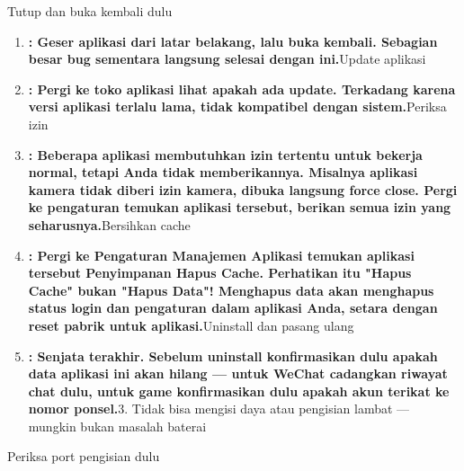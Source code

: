 
Tutup dan buka kembali dulu

\begin{enumerate}
  \item \textbf{: Geser aplikasi dari latar belakang, lalu buka kembali. Sebagian besar bug sementara langsung selesai dengan ini.}Update aplikasi
  \item \textbf{: Pergi ke toko aplikasi lihat apakah ada update. Terkadang karena versi aplikasi terlalu lama, tidak kompatibel dengan sistem.}Periksa izin
  \item \textbf{: Beberapa aplikasi membutuhkan izin tertentu untuk bekerja normal, tetapi Anda tidak memberikannya. Misalnya aplikasi kamera tidak diberi izin kamera, dibuka langsung force close. Pergi ke pengaturan temukan aplikasi tersebut, berikan semua izin yang seharusnya.}Bersihkan cache
  \item \textbf{: Pergi ke Pengaturan Manajemen Aplikasi temukan aplikasi tersebut Penyimpanan Hapus Cache. Perhatikan itu "Hapus Cache" bukan "Hapus Data"! Menghapus data akan menghapus status login dan pengaturan dalam aplikasi Anda, setara dengan reset pabrik untuk aplikasi.}Uninstall dan pasang ulang
  \item \textbf{: Senjata terakhir. Sebelum uninstall konfirmasikan dulu apakah data aplikasi ini akan hilang — untuk WeChat cadangkan riwayat chat dulu, untuk game konfirmasikan dulu apakah akun terikat ke nomor ponsel.}3. Tidak bisa mengisi daya atau pengisian lambat — mungkin bukan masalah baterai
\end{enumerate}


Periksa port pengisian dulu

